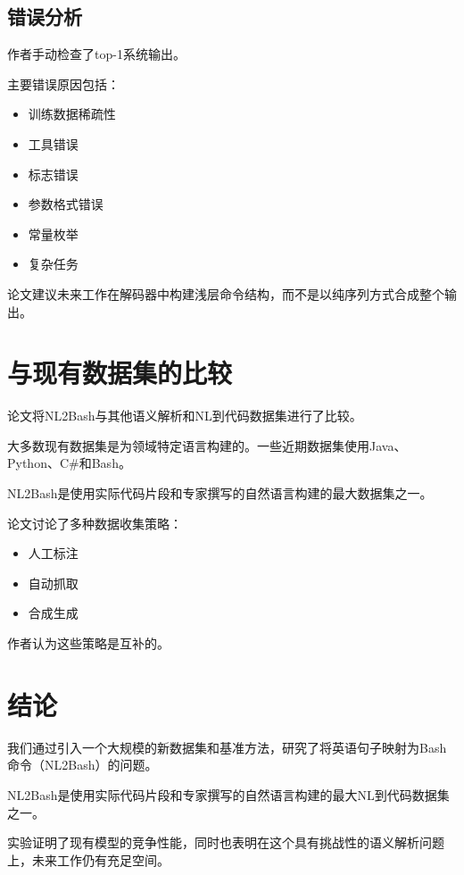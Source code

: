 \subsection{错误分析}

作者手动检查了top-1系统输出。

主要错误原因包括：

\begin{itemize}
    \item 训练数据稀疏性
    \item 工具错误
    \item 标志错误
    \item 参数格式错误
    \item 常量枚举
    \item 复杂任务
\end{itemize}

论文建议未来工作在解码器中构建浅层命令结构，而不是以纯序列方式合成整个输出。

\section{与现有数据集的比较}

论文将NL2Bash与其他语义解析和NL到代码数据集进行了比较。

大多数现有数据集是为领域特定语言构建的。一些近期数据集使用Java、Python、C\#和Bash。

NL2Bash是使用实际代码片段和专家撰写的自然语言构建的最大数据集之一。

论文讨论了多种数据收集策略：

\begin{itemize}
    \item 人工标注
    \item 自动抓取
    \item 合成生成
\end{itemize}

作者认为这些策略是互补的。

\section{结论}

我们通过引入一个大规模的新数据集和基准方法，研究了将英语句子映射为Bash命令（NL2Bash）的问题。

NL2Bash是使用实际代码片段和专家撰写的自然语言构建的最大NL到代码数据集之一。

实验证明了现有模型的竞争性能，同时也表明在这个具有挑战性的语义解析问题上，未来工作仍有充足空间。
